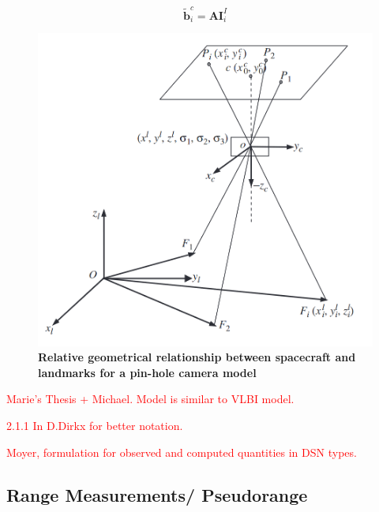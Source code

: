 \begin{equation}
    \tilde{\mathbf{b}}_i^c=\mathbf{A}\mathbf{I}_i^I
\end{equation}


\begin{figure}[htp]
    \centering
    \includegraphics[width=0.55\linewidth]{graphics/landmark_geometry.PNG}
    \caption{
        \textbf{Relative geometrical relationship between spacecraft and landmarks
        for a pin-hole camera model}
    }
\end{figure}





\textcolor{red}{Marie's Thesis + Michael. Model is similar to VLBI model.}

\textcolor{red}{2.1.1 In D.Dirkx for better notation.}

\textcolor{red}{Moyer, formulation for observed and computed quantities in DSN types.}
\subsection{Range Measurements/ Pseudorange}


